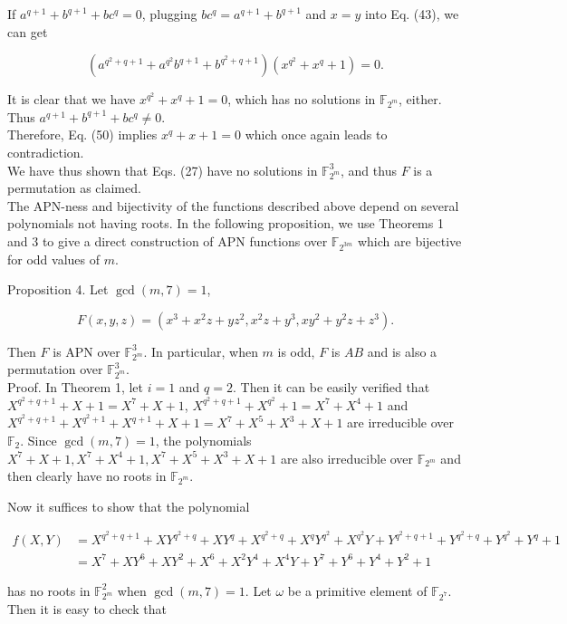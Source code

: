 \documentclass[10pt]{article}
\begin{document}
If $a^{q+1}+b^{q+1}+b c^{q}=0$, plugging $b c^{q}=a^{q+1}+b^{q+1}$ and $x=y$ into Eq. (43), we can get

$$
\left(a^{q^{2}+q+1}+a^{q^{2}} b^{q+1}+b^{q^{2}+q+1}\right)\left(x^{q^{2}}+x^{q}+1\right)=0 .
$$

It is clear that we have $x^{q^{2}}+x^{q}+1=0$, which has no solutions in $\mathbb{F}_{2^{m}}$, either. Thus $a^{q+1}+b^{q+1}+b c^{q} \neq 0$.\\
Therefore, Eq. (50) implies $x^{q}+x+1=0$ which once again leads to contradiction.\\
We have thus shown that Eqs. (27) have no solutions in $\mathbb{F}_{2^{m}}^{3}$, and thus $F$ is a permutation as claimed.\\
The APN-ness and bijectivity of the functions described above depend on several polynomials not having roots. In the following proposition, we use Theorems 1 and 3 to give a direct construction of APN functions over $\mathbb{F}_{2^{3 m}}$ which are bijective for odd values of $m$.

Proposition 4. Let $\operatorname{gcd}(m, 7)=1$,

$$
F(x, y, z)=\left(x^{3}+x^{2} z+y z^{2}, x^{2} z+y^{3}, x y^{2}+y^{2} z+z^{3}\right) .
$$

Then $F$ is APN over $\mathbb{F}_{2^{m}}^{3}$. In particular, when $m$ is odd, $F$ is $A B$ and is also a permutation over $\mathbb{F}_{2^{m}}^{3}$.\\
Proof. In Theorem 1, let $i=1$ and $q=2$. Then it can be easily verified that $X^{q^{2}+q+1}+X+1=X^{7}+X+1$, $X^{q^{2}+q+1}+X^{q^{2}}+1=X^{7}+X^{4}+1$ and $X^{q^{2}+q+1}+X^{q^{2}+1}+X^{q+1}+X+1=X^{7}+X^{5}+X^{3}+X+1$ are irreducible over $\mathbb{F}_{2}$. Since $\operatorname{gcd}(m, 7)=1$, the polynomials $X^{7}+X+1, X^{7}+X^{4}+1, X^{7}+X^{5}+X^{3}+X+1$ are also irreducible over $\mathbb{F}_{2^{m}}$ and then clearly have no roots in $\mathbb{F}_{2^{m}}$.

Now it suffices to show that the polynomial

$$
\begin{aligned}
f(X, Y) & =X^{q^{2}+q+1}+X Y^{q^{2}+q}+X Y^{q}+X^{q^{2}+q}+X^{q} Y^{q^{2}}+X^{q^{2}} Y+Y^{q^{2}+q+1}+Y^{q^{2}+q}+Y^{q^{2}}+Y^{q}+1 \\
& =X^{7}+X Y^{6}+X Y^{2}+X^{6}+X^{2} Y^{4}+X^{4} Y+Y^{7}+Y^{6}+Y^{4}+Y^{2}+1
\end{aligned}
$$

has no roots in $\mathbb{F}_{2^{m}}^{2}$ when $\operatorname{gcd}(m, 7)=1$. Let $\omega$ be a primitive element of $\mathbb{F}_{2^{7}}$. Then it is easy to check that
\end{document}

